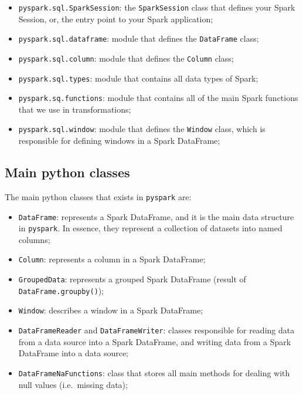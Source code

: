 \documentclass[
  11pt,
  letterpaper,
  DIV=11,
  numbers=noendperiod]{scrreprt}
\providecommand{\tightlist}{%
  \setlength{\itemsep}{0pt}\setlength{\parskip}{0pt}}\usepackage{longtable,booktabs,array}
\begin{document}
\begin{itemize}
\tightlist
\item
  \texttt{pyspark.sql.SparkSession}: the \texttt{SparkSession} class
  that defines your Spark Session, or, the entry point to your Spark
  application;
\item
  \texttt{pyspark.sql.dataframe}: module that defines the
  \texttt{DataFrame} class;
\item
  \texttt{pyspark.sql.column}: module that defines the \texttt{Column}
  class;
\item
  \texttt{pyspark.sql.types}: module that contains all data types of
  Spark;
\item
  \texttt{pyspark.sq.functions}: module that contains all of the main
  Spark functions that we use in transformations;
\item
  \texttt{pyspark.sql.window}: module that defines the \texttt{Window}
  class, which is responsible for defining windows in a Spark DataFrame;
\end{itemize}

\subsection{Main python classes}\label{main-python-classes}

The main python classes that exists in \texttt{pyspark} are:

\begin{itemize}
\item
  \texttt{DataFrame}: represents a Spark DataFrame, and it is the main
  data structure in \texttt{pyspark}. In essence, they represent a
  collection of datasets into named columns;
\item
  \texttt{Column}: represents a column in a Spark DataFrame;
\item
  \texttt{GroupedData}: represents a grouped Spark DataFrame (result of
  \texttt{DataFrame.groupby()});
\item
  \texttt{Window}: describes a window in a Spark DataFrame;
\item
  \texttt{DataFrameReader} and \texttt{DataFrameWriter}: classes
  responsible for reading data from a data source into a Spark
  DataFrame, and writing data from a Spark DataFrame into a data source;
\item
  \texttt{DataFrameNaFunctions}: class that stores all main methods for
  dealing with null values (i.e.~missing data);
\end{itemize}
\end{document}
